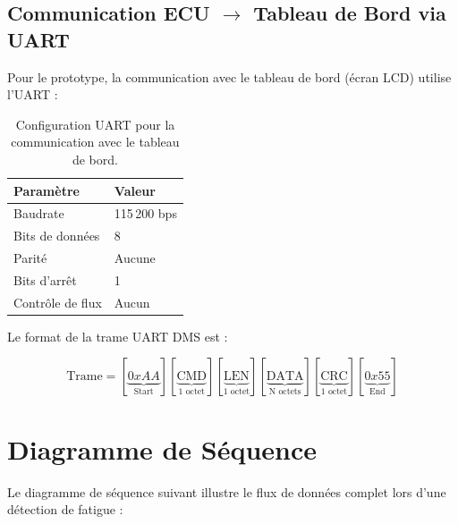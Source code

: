 \documentclass[12pt,a4paper,twoside]{report}
\begin{document}
\subsection{Communication ECU $\rightarrow$ Tableau de Bord via UART}

Pour le prototype, la communication avec le tableau de bord (écran LCD) utilise l'UART :

\begin{table}[H]
\centering
\caption{Configuration UART pour la communication avec le tableau de bord.}
\label{tab:uart_config}
\renewcommand{\arraystretch}{1.3}
\begin{tabular}{|l|l|}
\hline
\rowcolor{stellantisblue!15}
\textbf{Paramètre} & \textbf{Valeur} \\
\hline
Baudrate & 115\,200 bps \\
\hline
Bits de données & 8 \\
\hline
Parité & Aucune \\
\hline
Bits d'arrêt & 1 \\
\hline
Contrôle de flux & Aucun \\
\hline
\end{tabular}
\end{table}

Le format de la trame UART DMS est :

\begin{equation}
\text{Trame} = [\underbrace{0xAA}_{\text{Start}}][\underbrace{\text{CMD}}_{\text{1 octet}}][\underbrace{\text{LEN}}_{\text{1 octet}}][\underbrace{\text{DATA}}_{\text{N octets}}][\underbrace{\text{CRC}}_{\text{1 octet}}][\underbrace{0x55}_{\text{End}}]
\label{eq:uart_frame}
\end{equation}

\section{Diagramme de Séquence}

Le diagramme de séquence suivant illustre le flux de données complet lors d'une détection de fatigue :
\end{document}
